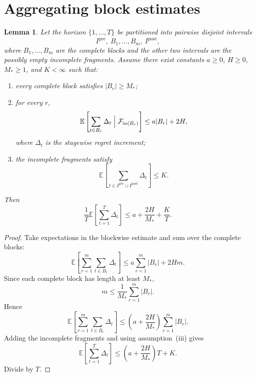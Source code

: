 \documentclass[12pt]{article}
\newtheorem{lemma}[theorem]{Lemma}
\theoremstyle{definition}
\newcommand{\E}{\mathbb{E}}
\newcommand{\1}{\mathbf{1}}
\newcommand{\cF}{\mathcal{F}}
\begin{document}
\section{Aggregating block estimates}
\label{app:aggregation}

\begin{lemma}
\label{lem:aggregation}
Let the horizon $\{1,\dots,T\}$ be partitioned into pairwise disjoint intervals
\[
I^{\mathrm{pre}},\ B_1,\dots,B_m,\ I^{\mathrm{post}},
\]
where $B_1,\dots,B_m$ are the complete blocks and the other two intervals are the
possibly empty incomplete fragments.  Assume there exist constants $a\ge 0$, $H\ge
0$, $M_*\ge 1$, and $K<\infty$ such that:
\begin{enumerate}[label=\textnormal{(\roman*)},leftmargin=2.6em]
\item every complete block satisfies $|B_r|\ge M_*$;
\item for every $r$,
\[
\E\left[\sum_{t\in B_r}\Delta_t\Bigm|\cF_{\mathrm{in}(B_r)}\right]
\le a|B_r|+2H,
\]
where $\Delta_t$ is the stagewise regret increment;
\item the incomplete fragments satisfy
\[
\E\left[\sum_{t\in I^{\mathrm{pre}}\cup I^{\mathrm{post}}}\Delta_t\right]\le K.
\]
\end{enumerate}
Then
\[
\frac1T\E\left[\sum_{t=1}^T\Delta_t\right]
\le a + \frac{2H}{M_*}+\frac{K}{T}.
\]
\end{lemma}

\begin{proof}
Take expectations in the blockwise estimate and sum over the complete blocks:
\[
\E\left[\sum_{r=1}^m\sum_{t\in B_r}\Delta_t\right]
\le a\sum_{r=1}^m|B_r| + 2Hm.
\]
Since each complete block has length at least $M_*$,
\[
m\le \frac{1}{M_*}\sum_{r=1}^m |B_r|.
\]
Hence
\[
\E\left[\sum_{r=1}^m\sum_{t\in B_r}\Delta_t\right]
\le
\left(a+\frac{2H}{M_*}\right)\sum_{r=1}^m|B_r|.
\]
Adding the incomplete fragments and using assumption~(iii) gives
\[
\E\left[\sum_{t=1}^T\Delta_t\right]
\le
\left(a+\frac{2H}{M_*}\right)T + K.
\]
Divide by $T$.
\end{proof}
\end{document}
